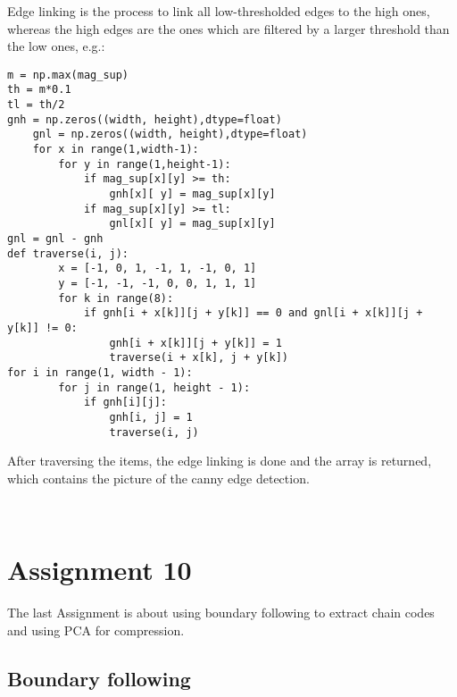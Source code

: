 Edge linking is the process to link all low-thresholded edges to the high ones, whereas the high edges are the ones which are filtered by a larger threshold than the low ones, e.g.:
\begin{verbatim}
m = np.max(mag_sup)      
th = m*0.1
tl = th/2
gnh = np.zeros((width, height),dtype=float)
    gnl = np.zeros((width, height),dtype=float)
    for x in range(1,width-1):
        for y in range(1,height-1):
            if mag_sup[x][y] >= th:
                gnh[x][ y] = mag_sup[x][y]
            if mag_sup[x][y] >= tl:
                gnl[x][ y] = mag_sup[x][y]
gnl = gnl - gnh
def traverse(i, j):
        x = [-1, 0, 1, -1, 1, -1, 0, 1]
        y = [-1, -1, -1, 0, 0, 1, 1, 1]
        for k in range(8):
            if gnh[i + x[k]][j + y[k]] == 0 and gnl[i + x[k]][j + y[k]] != 0:
                gnh[i + x[k]][j + y[k]] = 1
                traverse(i + x[k], j + y[k])
for i in range(1, width - 1):
        for j in range(1, height - 1):
            if gnh[i][j]:
                gnh[i, j] = 1
                traverse(i, j)
\end{verbatim}               
After traversing the items, the edge linking is done and the array is returned, which contains the picture of the canny edge detection.


\begin{figure*}[h!]
    \centering
 ~
 ~
 ~
 ~
\end{figure*}


\section{Assignment 10}

The last Assignment is about using boundary following to extract chain codes and using PCA for compression.

\subsection{Boundary following}


